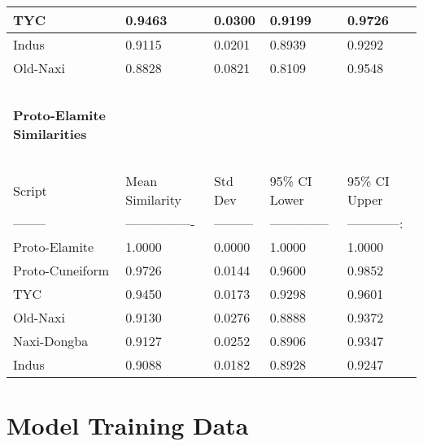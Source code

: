 \documentclass[11pt,a4paper,oneside]{report}
\begin{document}
\begin{table}[H]
\begin{tabular}{|l|l|l|l|l|}
        TYC & 0.9463 & 0.0300 & 0.9199 & 0.9726 \\ \hline
        Indus & 0.9115 & 0.0201 & 0.8939 & 0.9292 \\ \hline
        Old-Naxi & 0.8828 & 0.0821 & 0.8109 & 0.9548 \\ \hline
        ~ & ~ & ~ & ~ & ~ \\ \hline
        \textbf{Proto-Elamite Similarities} & ~ & ~ & ~ & ~ \\ \hline
        ~ & ~ & ~ & ~ & ~ \\ \hline
        Script & Mean Similarity & Std Dev & 95\% CI Lower & 95\% CI Upper \\ \hline
        -------- & ---------------- & --------- & -------------- & ------------: \\ \hline
        Proto-Elamite & 1.0000 & 0.0000 & 1.0000 & 1.0000 \\ \hline
        Proto-Cuneiform & 0.9726 & 0.0144 & 0.9600 & 0.9852 \\ \hline
        TYC & 0.9450 & 0.0173 & 0.9298 & 0.9601 \\ \hline
        Old-Naxi & 0.9130 & 0.0276 & 0.8888 & 0.9372 \\ \hline
        Naxi-Dongba & 0.9127 & 0.0252 & 0.8906 & 0.9347 \\ \hline
        Indus & 0.9088 & 0.0182 & 0.8928 & 0.9247 \\ \hline
    \end{tabular}
\end{table}

\newpage
\section{Model Training Data}
\label{app: model-train}
\end{document}
